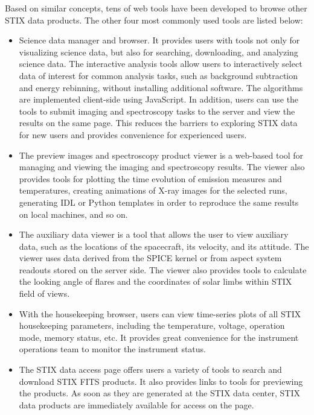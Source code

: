 \documentclass[referee]{preaa} %
\begin{document}
Based on similar concepts, tens of web tools have been developed to browse other STIX data products.
The other four most commonly used tools are listed below: 
\begin{itemize}
  \item  Science data manager and browser.  It provides users with tools not only for visualizing science data, but also for searching, downloading, and analyzing science data. The interactive analysis tools allow users to interactively select data of interest for common analysis tasks, such as background subtraction and energy rebinning,  without installing additional software. 
  The algorithms are implemented client-side using JavaScript. 
 In addition, users can use the tools to submit imaging and spectroscopy tasks to the server and view the results on the same page. This reduces the barriers to exploring STIX data for new users and provides convenience for experienced users.

  \item  The preview images and spectroscopy product viewer is a web-based tool for managing and viewing the imaging and spectroscopy results. The viewer also provides tools for plotting the time evolution of emission measures and temperatures,  creating animations of X-ray images for the selected runs, generating IDL or Python templates in order to reproduce the same results on  local machines, and so on. 
  \item The auxiliary data viewer is a tool that allows the user to view auxiliary data, such as the locations of the spacecraft, its velocity, and its attitude. The viewer uses data derived from the SPICE kernel or from aspect system readouts stored on the server side.  The viewer also provides tools to calculate the looking angle of flares and the coordinates of solar limbs within STIX field of views.
  \item  With the housekeeping browser, users can view time-series plots of all STIX housekeeping parameters, including the temperature, voltage, operation mode, memory status, etc. It provides great convenience for the instrument operations team to monitor the instrument status. 
\item 
The STIX data access page offers users a variety of tools to search and download STIX FITS products. 
It also provides links to tools for previewing the products. As soon as they are generated at the STIX data center, STIX data products are immediately available for access on the page.
\end{itemize}
\end{document}
